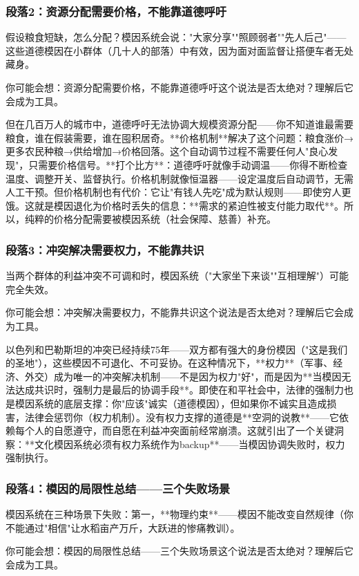 \documentclass[a4paper,12pt]{book}
\newenvironment{motivation}{\begin{tcolorbox}[colback=gray!10,colframe=gray!60,title=\textit{本章动机},fonttitle=\bfseries,arc=0mm,leftrule=3mm]\small\itshape}{\end{tcolorbox}}
\begin{document}
\begin{motivation}
\begin{motivation}
\begin{motivation}
	\subsubsection*{段落2：资源分配需要价格，不能靠道德呼吁}
	假设粮食短缺，怎么分配？模因系统会说："大家分享""照顾弱者""先人后己"——这些道德模因在小群体（几十人的部落）中有效，因为面对面监督让搭便车者无处藏身。
	\begin{tcolorbox}[colback=yellow!5, title=\textit{读者行为预测}]
		你可能会想：资源分配需要价格，不能靠道德呼吁这个说法是否太绝对？理解后它会成为工具。
	\end{tcolorbox}

但在几百万人的城市中，道德呼吁无法协调大规模资源分配——你不知道谁最需要粮食，谁在假装需要，谁在囤积居奇。**价格机制**解决了这个问题：粮食涨价→更多农民种粮→供给增加→价格回落。这个自动调节过程不需要任何人"良心发现"，只需要价格信号。**打个比方**：道德呼吁就像手动调温——你得不断检查温度、调整开关、监督执行。价格机制就像恒温器——设定温度后自动调节，无需人工干预。但价格机制也有代价：它让"有钱人先吃"成为默认规则——即使穷人更饿。这就是模因退化为价格时丢失的信息：**需求的紧迫性被支付能力取代**。所以，纯粹的价格分配需要被模因系统（社会保障、慈善）补充。

	\subsubsection*{段落3：冲突解决需要权力，不能靠共识}
	当两个群体的利益冲突不可调和时，模因系统（"大家坐下来谈""互相理解"）可能完全失效。
	\begin{tcolorbox}[colback=yellow!5, title=\textit{读者行为预测}]
		你可能会想：冲突解决需要权力，不能靠共识这个说法是否太绝对？理解后它会成为工具。
	\end{tcolorbox}

以色列和巴勒斯坦的冲突已经持续75年——双方都有强大的身份模因（"这是我们的圣地"），这些模因不可退化、不可妥协。在这种情况下，**权力**（军事、经济、外交）成为唯一的冲突解决机制——不是因为权力"好"，而是因为**当模因无法达成共识时，强制力是最后的协调手段**。即使在和平社会中，法律的强制力也是模因系统的底层支撑：你"应该"诚实（道德模因），但如果你不诚实且造成损害，法律会惩罚你（权力机制）。没有权力支撑的道德是**空洞的说教**——它依赖每个人的自愿遵守，而自愿在利益冲突面前经常崩溃。这就引出了一个关键洞察：**文化模因系统必须有权力系统作为backup**——当模因协调失败时，权力强制执行。

	\subsubsection*{段落4：模因的局限性总结——三个失败场景}
	模因系统在三种场景下失败：第一，**物理约束**——模因不能改变自然规律（你不能通过"相信"让水稻亩产万斤，大跃进的惨痛教训）。
	\begin{tcolorbox}[colback=yellow!5, title=\textit{读者行为预测}]
		你可能会想：模因的局限性总结——三个失败场景这个说法是否太绝对？理解后它会成为工具。
	\end{tcolorbox}


\end{motivation}
\end{motivation}
\end{motivation}
\end{document}
